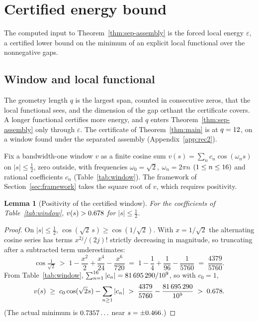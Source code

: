 \documentclass[11pt]{article}
\newtheorem{lemma}[theorem]{Lemma}
\theoremstyle{definition}
\newcommand{\eps}{\varepsilon}
\begin{document}
\section{Certified energy bound}\label{sec:cert}

The computed input to Theorem~\ref{thm:sep-assembly} is the forced local
energy $\eps$, a certified lower bound on the minimum of an explicit local
functional over the nonnegative gaps.

\subsection{Window and local functional}
The geometry length $q$ is the largest span, counted in consecutive zeros,
that the local functional sees, and the dimension of the gap orthant the
certificate covers. A longer functional certifies more energy, and $q$ enters
Theorem~\ref{thm:sep-assembly} only through $\eps$. The certificate of
Theorem~\ref{thm:main} is at $q=12$, on a window found under the separated
assembly (Appendix~\ref{app:rec2}).

Fix a bandwidth-one window $v$ as a finite cosine sum
$v(s)=\sum_{n}c_n\cos(\omega_n s)$ on $|s|\le\tfrac12$, zero outside, with
frequencies $\omega_0=\sqrt2,\ \omega_n=2\pi n$ $(1\le n\le16)$ and rational
coefficients $c_n$ (Table~\ref{tab:window}). The framework of Section~\ref{sec:framework} takes the square root of $v$, which
requires positivity.

\begin{lemma}[Positivity of the certified window]\label{lem:positive}
For the coefficients of Table~\ref{tab:window}, $v(s)>0.678$ for
$|s|\le\tfrac12$.
\end{lemma}

\begin{proof}
On $|s|\le\tfrac12$, $\cos(\sqrt2\,s)\ge\cos(1/\sqrt2)$. With $x=1/\sqrt2$ the
alternating cosine series has terms $x^{2j}/(2j)!$ strictly decreasing in
magnitude, so truncating after a subtracted term underestimates:
\[
  \cos\tfrac1{\sqrt2}\;>\;1-\frac{x^2}{2}+\frac{x^4}{24}-\frac{x^6}{720}
  \;=\;1-\frac14+\frac1{96}-\frac1{5760}\;=\;\frac{4379}{5760}.
\]
From Table~\ref{tab:window}, $\sum_{n=1}^{16}|c_n|=81\,695\,290/10^{9}$,
so with $c_0=1$,
\[
  v(s)\;\ge\;c_0\cos(\sqrt2 s)-\sum_{n\ge1}|c_n|
  \;>\;\frac{4379}{5760}-\frac{81\,695\,290}{10^{9}}\;>\;0.678 .
\]
(The actual minimum is $0.7357\ldots$ near $s=\pm0.466$.)
\end{proof}
\end{document}

